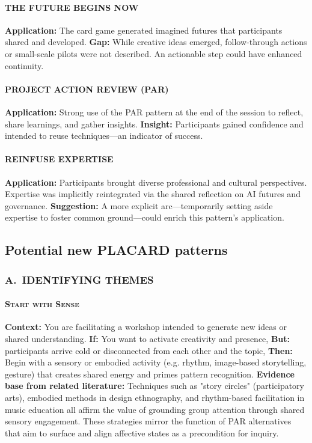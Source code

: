 \documentclass[acmlarge,timestamp]{acmart}
\begin{document}
{\paragraph*{THE FUTURE BEGINS NOW}

\noindent \textbf{Application:} The card game generated imagined futures that participants shared and developed. \textbf{Gap:} While creative ideas emerged, follow-through actions or small-scale pilots were not described. An actionable step could have enhanced continuity.

\paragraph*{PROJECT ACTION REVIEW (PAR)}

\noindent \textbf{Application:} Strong use of the PAR pattern at the end of the session to reflect, share learnings, and gather insights. \textbf{Insight:} Participants gained confidence and intended to reuse techniques—an indicator of success.

\paragraph*{REINFUSE EXPERTISE}

\noindent \textbf{Application:} Participants brought diverse professional and cultural perspectives. Expertise was implicitly reintegrated via the shared reflection on AI futures and governance. \textbf{Suggestion:} A more explicit arc—temporarily setting aside expertise to foster common ground—could enrich this pattern’s application.

\subsection*{Potential new PLACARD patterns}

\subsubsection*{A.~IDENTIFYING THEMES}

\paragraph*{{\scshape Start with Sense}}

\noindent\textbf{Context:} You are facilitating a workshop intended to generate new ideas or shared understanding.
\textbf{If:} You want to activate creativity and presence,  \textbf{But:} participants arrive cold or disconnected from each other and the topic,
\textbf{Then:} Begin with a sensory or embodied activity (e.g. rhythm, image-based storytelling, gesture) that creates shared energy and primes pattern recognition.
\textbf{Evidence base from related literature:} Techniques such as "story circles" (participatory arts), embodied methods in design ethnography, and rhythm-based facilitation in music education all affirm the value of grounding group attention through shared sensory engagement. These strategies mirror the function of PAR alternatives that aim to surface and align affective states as a precondition for inquiry.

}
\end{document}
